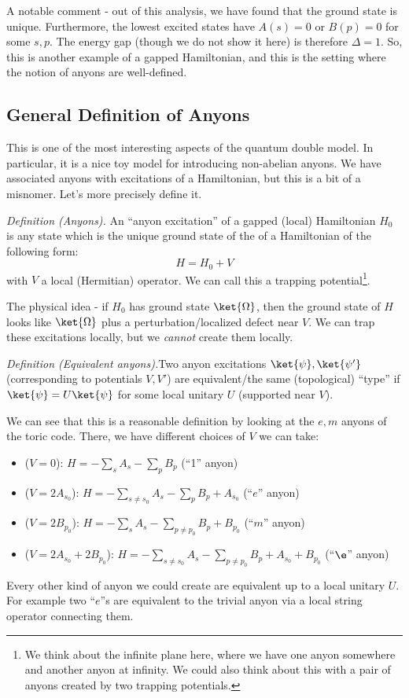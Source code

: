 A notable comment - out of this analysis, we have found that the ground state is unique. Furthermore, the lowest excited states have $A(s) = 0$ or $B(p) = 0$ for some $s, p$. The energy gap (though we do not show it here) is therefore $\Delta = 1$. So, this is another example of a gapped Hamiltonian, and this is the setting where the notion of anyons are well-defined.

\subsection{General Definition of Anyons}
This is one of the most interesting aspects of the quantum double model. In particular, it is a nice toy model for introducing non-abelian anyons. We have associated anyons with excitations of a Hamiltonian, but this is a bit of a misnomer. Let's more precisely define it.

\emph{Definition (Anyons).} An ``anyon excitation'' of a gapped (local) Hamiltonian $H_0$ is any state which is the unique ground state of the of a Hamiltonian of the following form:
\begin{equation}
    H = H_0 + V
\end{equation}
with $V$ a local (Hermitian) operator. We can call this a trapping potential\footnote{We think about the infinite plane here, where we have one anyon somewhere and another anyon at infinity. We could also think about this with a pair of anyons created by two trapping potentials.}.

The physical idea - if $H_0$ has ground state $\ket{\Omega}$, then the ground state of $H$ looks like $\ket{\Omega}$ plus a perturbation/localized defect near $V$. We can trap these excitations locally, but we \emph{cannot} create them locally.

\emph{Definition (Equivalent anyons).}Two anyon excitations $\ket{\psi}, \ket{\psi'}$ (corresponding to potentials $V, V'$) are equivalent/the same (topological) ``type'' if $\ket{\psi} = U\ket{\psi}$ for some local unitary $U$ (supported near $V$).

We can see that this is a reasonable definition by looking at the $e, m$ anyons of the toric code. There, we have different choices of $V$ we can take:
\begin{itemize}
    \item ($V = 0$): $H = -\sum_s A_s - \sum_p B_p$ (``1'' anyon)
    \item ($V = 2A_{s_0}$): $H = -\sum_{s \neq s_0} A_s - \sum_p B_p + A_{s_0}$ (``$e$'' anyon)
    \item ($V = 2B_{p_0}$): $H = -\sum_s A_s - \sum_{p\neq p_0} B_p + B_{p_0}$ (``$m$'' anyon)
    \item ($V = 2A_{s_0} + 2B_{p_0}$): $H = -\sum_{s \neq s_0} A_s - \sum_{p \neq p_0} B_p + A_{s_0} + B_{p_0}$ (``$\e$'' anyon)
\end{itemize}
Every other kind of anyon we could create are equivalent up to a local unitary $U$. For example two ``$e$''s are equivalent to the trivial anyon via a local string operator connecting them.

